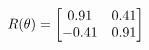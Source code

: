 \documentclass[preview]{standalone}
\begin{document}
\begin{align*}
\special{dvisvgm:raw <g id='unique000'>}R(\theta) = \begin{bmatrix}0.91 & 0.41\\-0.41 & 0.91\end{bmatrix}\special{dvisvgm:raw </g>}
\end{align*}
\end{document}
